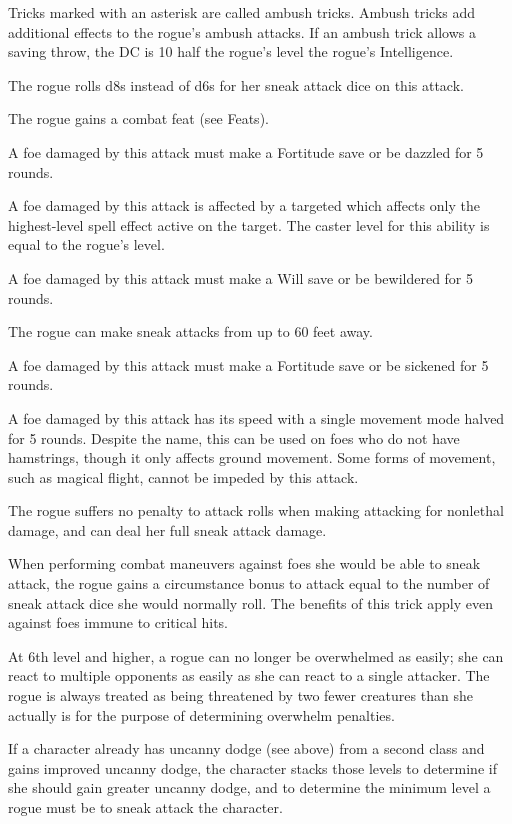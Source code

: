 \par Tricks marked with an asterisk are called ambush tricks. Ambush tricks add additional effects to the rogue's ambush attacks. If an ambush trick allows a saving throw, the DC is 10 \add half the rogue's level \add the rogue's Intelligence.

 The rogue rolls d8s instead of d6s for her sneak attack dice on this attack.

 The rogue gains a combat feat (see Feats).

 A foe damaged by this attack must make a Fortitude save or be dazzled for 5 rounds.

 A foe damaged by this attack is affected by a targeted  which affects only the highest-level spell effect active on the target. The caster level for this ability is equal to the rogue's level.

 A foe damaged by this attack must make a Will save or be bewildered for 5 rounds.

 The rogue can make sneak attacks from up to 60 feet away.

 A foe damaged by this attack must make a Fortitude save or be sickened for 5 rounds.

 A foe damaged by this attack has its speed with a single movement mode halved for 5 rounds. Despite the name, this can be used on foes who do not have hamstrings, though it only affects ground movement. Some forms of movement, such as magical flight, cannot be impeded by this attack.

 The rogue suffers no penalty to attack rolls when making attacking for nonlethal damage, and can deal her full sneak attack damage.

 When performing combat maneuvers against foes she would be able to sneak attack, the rogue gains a circumstance bonus to attack equal to the number of sneak attack dice she would normally roll. The benefits of this trick apply even against foes immune to critical hits.

 At 6th level and higher, a rogue can no longer be overwhelmed as easily; she can react to multiple opponents as easily as she can react to a single attacker. The rogue is always treated as being threatened by two fewer creatures than she actually is for the purpose of determining overwhelm penalties. 
\par If a character already has uncanny dodge (see above) from a second class and gains improved uncanny dodge, the character stacks those levels to determine if she should gain greater uncanny dodge, and to determine the minimum level a rogue must be to sneak attack the character.

